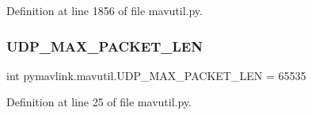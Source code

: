 Definition at line 1856 of file mavutil.\+py.

\mbox{\label{namespacepymavlink_1_1mavutil_a1fce3ac17837c857546999343dbd5bc3}} 
\subsubsection{\texorpdfstring{UDP\_MAX\_PACKET\_LEN}{UDP\_MAX\_PACKET\_LEN}}
{\footnotesize\ttfamily int pymavlink.\+mavutil.\+U\+D\+P\+\_\+\+M\+A\+X\+\_\+\+P\+A\+C\+K\+E\+T\+\_\+\+L\+EN = 65535}



Definition at line 25 of file mavutil.\+py.

